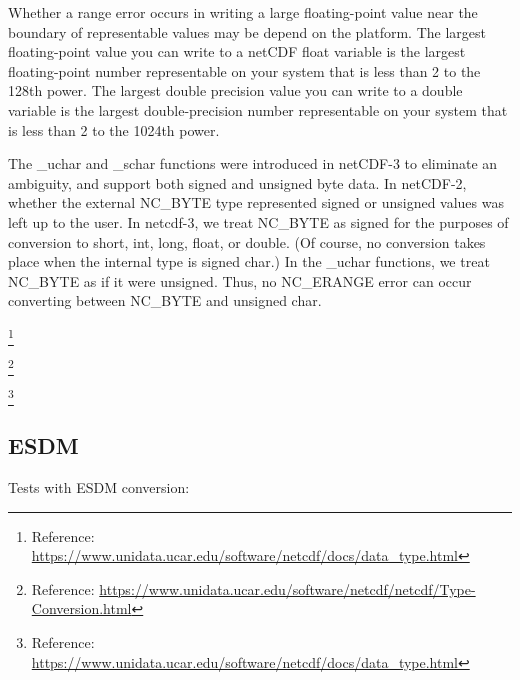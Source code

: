 \begin{framed}
Whether a range error occurs in writing a large floating-point value near the boundary of representable values may be depend on the platform. The largest floating-point value you can write to a netCDF float variable is the largest floating-point number representable on your system that is less than 2 to the 128th power. The largest double precision value you can write to a double variable is the largest double-precision number representable on your system that is less than 2 to the 1024th power.

The \_uchar and \_schar functions were introduced in netCDF-3 to eliminate an ambiguity, and support both signed and unsigned byte data. In netCDF-2, whether the external NC\_BYTE type represented signed or unsigned values was left up to the user. In netcdf-3, we treat NC\_BYTE as signed for the purposes of conversion to short, int, long, float, or double. (Of course, no conversion takes place when the internal type is signed char.) In the \_uchar functions, we treat NC\_BYTE as if it were unsigned. Thus, no NC\_ERANGE error can occur converting between NC\_BYTE and unsigned char.

\footnote{Reference: \url{https://www.unidata.ucar.edu/software/netcdf/docs/data_type.html}}

\footnote{Reference: \url{https://www.unidata.ucar.edu/software/netcdf/netcdf/Type-Conversion.html}}

\end{framed}

\footnote{Reference: \url{https://www.unidata.ucar.edu/software/netcdf/docs/data_type.html}}

\subsection{ESDM}

\tab
Tests with ESDM conversion:

